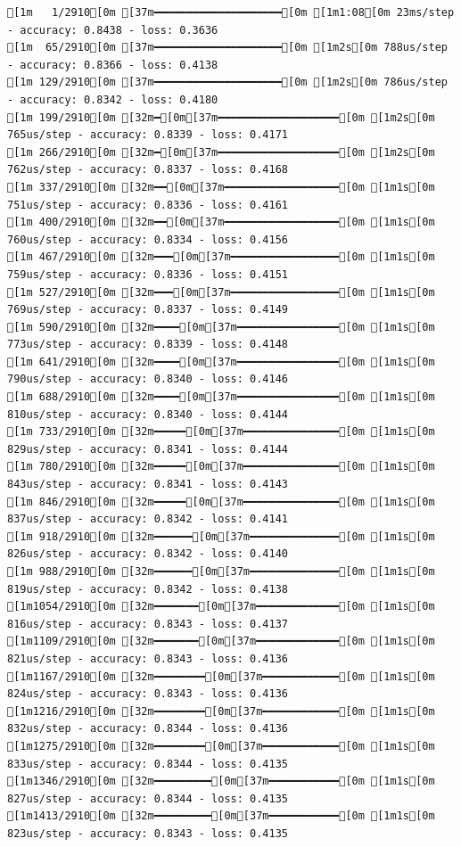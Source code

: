\documentclass[
  letterpaper,
  DIV=11,
  numbers=noendperiod]{scrartcl}
\begin{document}
\begin{verbatim}
[1m   1/2910[0m [37m━━━━━━━━━━━━━━━━━━━━[0m [1m1:08[0m 23ms/step - accuracy: 0.8438 - loss: 0.3636
[1m  65/2910[0m [37m━━━━━━━━━━━━━━━━━━━━[0m [1m2s[0m 788us/step - accuracy: 0.8366 - loss: 0.4138 
[1m 129/2910[0m [37m━━━━━━━━━━━━━━━━━━━━[0m [1m2s[0m 786us/step - accuracy: 0.8342 - loss: 0.4180
[1m 199/2910[0m [32m━[0m[37m━━━━━━━━━━━━━━━━━━━[0m [1m2s[0m 765us/step - accuracy: 0.8339 - loss: 0.4171
[1m 266/2910[0m [32m━[0m[37m━━━━━━━━━━━━━━━━━━━[0m [1m2s[0m 762us/step - accuracy: 0.8337 - loss: 0.4168
[1m 337/2910[0m [32m━━[0m[37m━━━━━━━━━━━━━━━━━━[0m [1m1s[0m 751us/step - accuracy: 0.8336 - loss: 0.4161
[1m 400/2910[0m [32m━━[0m[37m━━━━━━━━━━━━━━━━━━[0m [1m1s[0m 760us/step - accuracy: 0.8334 - loss: 0.4156
[1m 467/2910[0m [32m━━━[0m[37m━━━━━━━━━━━━━━━━━[0m [1m1s[0m 759us/step - accuracy: 0.8336 - loss: 0.4151
[1m 527/2910[0m [32m━━━[0m[37m━━━━━━━━━━━━━━━━━[0m [1m1s[0m 769us/step - accuracy: 0.8337 - loss: 0.4149
[1m 590/2910[0m [32m━━━━[0m[37m━━━━━━━━━━━━━━━━[0m [1m1s[0m 773us/step - accuracy: 0.8339 - loss: 0.4148
[1m 641/2910[0m [32m━━━━[0m[37m━━━━━━━━━━━━━━━━[0m [1m1s[0m 790us/step - accuracy: 0.8340 - loss: 0.4146
[1m 688/2910[0m [32m━━━━[0m[37m━━━━━━━━━━━━━━━━[0m [1m1s[0m 810us/step - accuracy: 0.8340 - loss: 0.4144
[1m 733/2910[0m [32m━━━━━[0m[37m━━━━━━━━━━━━━━━[0m [1m1s[0m 829us/step - accuracy: 0.8341 - loss: 0.4144
[1m 780/2910[0m [32m━━━━━[0m[37m━━━━━━━━━━━━━━━[0m [1m1s[0m 843us/step - accuracy: 0.8341 - loss: 0.4143
[1m 846/2910[0m [32m━━━━━[0m[37m━━━━━━━━━━━━━━━[0m [1m1s[0m 837us/step - accuracy: 0.8342 - loss: 0.4141
[1m 918/2910[0m [32m━━━━━━[0m[37m━━━━━━━━━━━━━━[0m [1m1s[0m 826us/step - accuracy: 0.8342 - loss: 0.4140
[1m 988/2910[0m [32m━━━━━━[0m[37m━━━━━━━━━━━━━━[0m [1m1s[0m 819us/step - accuracy: 0.8342 - loss: 0.4138
[1m1054/2910[0m [32m━━━━━━━[0m[37m━━━━━━━━━━━━━[0m [1m1s[0m 816us/step - accuracy: 0.8343 - loss: 0.4137
[1m1109/2910[0m [32m━━━━━━━[0m[37m━━━━━━━━━━━━━[0m [1m1s[0m 821us/step - accuracy: 0.8343 - loss: 0.4136
[1m1167/2910[0m [32m━━━━━━━━[0m[37m━━━━━━━━━━━━[0m [1m1s[0m 824us/step - accuracy: 0.8343 - loss: 0.4136
[1m1216/2910[0m [32m━━━━━━━━[0m[37m━━━━━━━━━━━━[0m [1m1s[0m 832us/step - accuracy: 0.8344 - loss: 0.4136
[1m1275/2910[0m [32m━━━━━━━━[0m[37m━━━━━━━━━━━━[0m [1m1s[0m 833us/step - accuracy: 0.8344 - loss: 0.4135
[1m1346/2910[0m [32m━━━━━━━━━[0m[37m━━━━━━━━━━━[0m [1m1s[0m 827us/step - accuracy: 0.8344 - loss: 0.4135
[1m1413/2910[0m [32m━━━━━━━━━[0m[37m━━━━━━━━━━━[0m [1m1s[0m 823us/step - accuracy: 0.8343 - loss: 0.4135

\end{verbatim}
\end{document}
